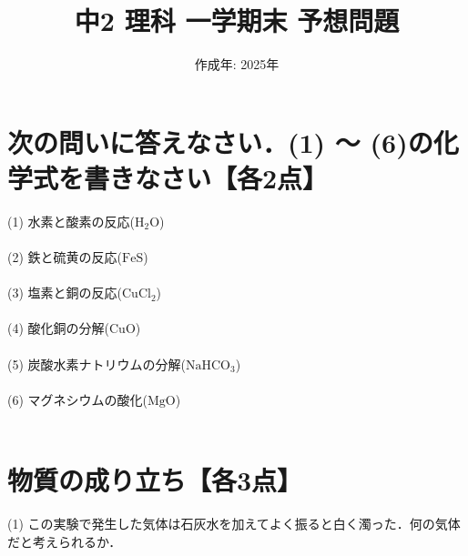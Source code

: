 \documentclass[autodetect-engine,dvi=dvipdfmx,ja=standard,
               a4j,11pt]{bxjsarticle}
\title{中2 理科 一学期末 予想問題}
\author{}
\date{作成年: 2025年\\}  %
\begin{document}
\maketitle
\section{\textbf{次の問いに答えなさい．(1) ～ (6)の化学式を書きなさい}【各2点】}
    (1) 水素と酸素の反応($\mathrm{H_2O}$)\\\\

    (2) 鉄と硫黄の反応($\mathrm{FeS}$)\\\\

    (3) 塩素と銅の反応($\mathrm{CuCl_2}$)\\\\

    (4) 酸化銅の分解($\mathrm{CuO} $)\\\\

    (5) 炭酸水素ナトリウムの分解($\mathrm{NaHCO_3}$)\\\\

    (6) マグネシウムの酸化($\mathrm{MgO} $)\\\\
    \clearpage
\section{物質の成り立ち【各3点】}
\begin{figure}[htb]
        \centering
        \vspace{20pt} %
        \caption{}
\end{figure}
    (1) この実験で発生した気体は石灰水を加えてよく振ると白く濁った．何の気体だと考えられるか．\\\\
\end{document}
